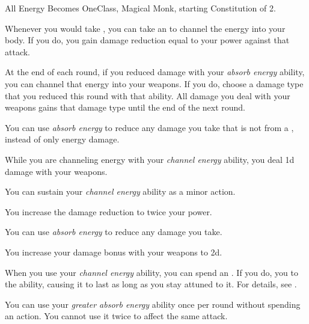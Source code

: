     \begin{feat}{All Energy Becomes One}{Class, Magical}
        \featpre Monk, starting Constitution of 2.

         Whenever you would take , you can take an  to channel the energy into your body.
        If you do, you gain damage reduction equal to your \ki power against that attack.

         At the end of each round, if you reduced damage with your \textit{absorb energy} ability, you can channel that energy into your weapons.
        If you do, choose a damage type that you reduced this round with that ability.
        All damage you deal with your weapons gains that damage type until the end of the next round.

         You can use \textit{absorb energy} to reduce any damage you take that is not from a , instead of only energy damage.

         While you are channeling energy with your \textit{channel energy} ability, you deal \plus1d damage with your weapons.

         You can sustain your \textit{channel energy} ability as a minor action.

         You increase the damage reduction to twice your \ki power.

         You can use \textit{absorb energy} to reduce any damage you take.

         You increase your damage bonus with your weapons to \plus2d.

         When you use your \textit{channel energy} ability, you can spend an .
        If you do, you  to the ability, causing it to last as long as you stay attuned to it.
        For details, see .

         You can use your \textit{greater absorb energy} ability once per round without spending an action.
        You cannot use it twice to affect the same attack.
    \end{feat}

